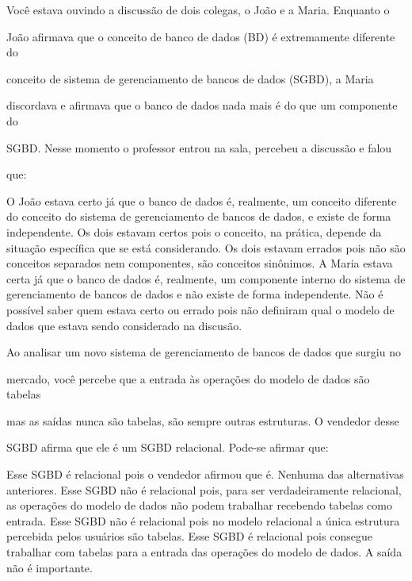 \documentclass[12pt, addpoints]{exam}
\begin{document}
\begin{questions}
\question

Você estava ouvindo a discussão de dois colegas, o João e a Maria. Enquanto o

João afirmava que o conceito de banco de dados (BD) é extremamente diferente do

conceito de sistema de gerenciamento de bancos de dados (SGBD), a Maria

discordava e afirmava que o banco de dados nada mais é do que um componente do

SGBD. Nesse momento o professor entrou na sala, percebeu a discussão e falou

que:
\begin{choices}
\choice O João estava certo já que o banco de dados é, realmente, um conceito diferente do conceito do sistema de gerenciamento de bancos de dados, e existe de forma independente.
\choice Os dois estavam certos pois o conceito, na prática, depende da situação específica que se está considerando.
\choice Os dois estavam errados pois não são conceitos separados nem componentes, são conceitos sinônimos.
\choice A Maria estava certa já que o banco de dados é, realmente, um componente interno do sistema de gerenciamento de bancos de dados e não existe de forma independente.
\choice Não é possível saber quem estava certo ou errado pois não definiram qual o modelo de dados que estava sendo considerado na discusão.
\end{choices}

\question

Ao analisar um novo sistema de gerenciamento de bancos de dados que surgiu no

mercado, você percebe que a entrada às operações do modelo de dados são tabelas

mas as saídas nunca são tabelas, são sempre outras estruturas. O vendedor desse

SGBD afirma que ele é um SGBD relacional. Pode-se afirmar que:


\begin{choices}
\choice Esse SGBD é relacional pois o vendedor afirmou que é.
\choice Nenhuma das alternativas anteriores.
\choice Esse SGBD não é relacional pois, para ser verdadeiramente relacional, as operações do modelo de dados não podem trabalhar recebendo tabelas como entrada.
\choice Esse SGBD não é relacional pois no modelo relacional a única estrutura percebida pelos usuários são tabelas.
\choice Esse SGBD é relacional pois consegue trabalhar com tabelas para a entrada das operações do modelo de dados. A saída não é importante.
\end{choices}



    \end{questions}
    
\end{document}
